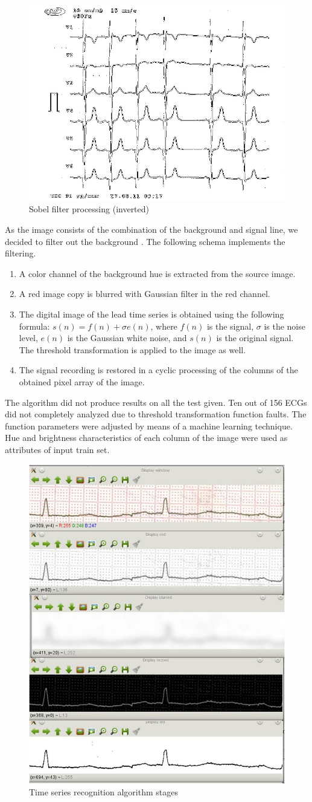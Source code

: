 \documentclass[runningheads]{AIIT}
\begin{document}
\begin{figure}[htb]
  \centering
    \includegraphics[width=0.5\linewidth] {images/Sobel.jpg}
  \caption{Sobel filter processing (inverted)}
  \label{fig:sobel-ex}
\end{figure}

As the image consists of the combination of the background and signal line, we decided to filter out the background \cite{1}.  The following schema implements the filtering.
\begin{enumerate}
\item A color channel of the background hue is extracted from the source image.
\item A red image copy is blurred with Gaussian filter in the red channel.
\item The digital image of the lead time series is obtained using the following formula:
  $s(n)=f(n)+\sigma e(n)$, where $f(n)$ is the signal, $\sigma$ is the
  noise level, $e(n)$ is the Gaussian white noise, and $s(n)$ is the original
  signal.  The threshold transformation is applied to the image as well.
\item The signal recording is restored in a cyclic processing of the columns of the obtained pixel array of the image.
\end{enumerate}
The algorithm did not produce results on all the test given.  Ten out of 156 ECGs did not completely analyzed due to threshold transformation function faults.  The function parameters were adjusted by means of a machine learning technique.  Hue and brightness characteristics of each column of the image were used as attributes of input train set.

\begin{figure}[htb]
  \centering
    \includegraphics[width=0.5\linewidth] {images/Algorithm.jpg}
  \caption{Time series recognition algorithm stages}
  \label{fig:leads-ex}
\end{figure}
\end{document}
